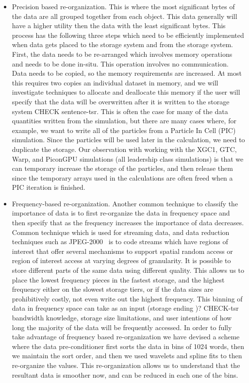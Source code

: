 \begin{itemize} 
	
\item Precision based re-organization. This is where the most significant bytes
	of the data are all grouped together from each object. This data
	generally will have a higher utility then the data with the least
	significant bytes.  This process has the following three steps which
	need to be efficiently implemented when data gets placed to the storage
	system and from the storage system.  First, the data needs to be
	re-arranged which involves memory operations and needs to be done
	in-situ. This operation involves no communication.  Data needs to be
	copied, so the memory requirements are increased. {\color{red}At most this requires
	two copies an individual dataset in memory, and we will investigate
	techniques to allocate and deallocate this memory if the user will
	specify that the data will be overwritten after it is written to the
	storage system CHECK sentence-tsr}. This is often the case for many of the data quantities
	written from the simulation, but there are many cases where, for
	example, we want to write all of the particles from a Particle In Cell
	(PIC) simulation.  Since the particles will be used later in the
	calculation, we need to duplicate the storage. Our observation with
	working with the XGC1, GTC, Warp, and PiconGPU simulations (all
	leadership class simulations) is that we can temporary increase the
	storage of the particles, and then release them since the temporary
	arrays used in the calculations are often freed when a PIC iteration is
	finished. 
%
\item Frequency-based re-organization.  Another common technique to classify
	the importance of data is to first re-organize the data in frequency
	space and then specify that as the frequency increases the importance
	of data decreases.   Common technique which is used for streaming data,
	and data reduction techniques such as JPEG-2000~\cite{jpeg2000} is to
	code streams which have regions of interest that offer several
	mechanisms to support spatial random access or region of interest
	access at varying degrees of granularity. It is possible to store
	different parts of the same data using different quality.  This allows
	us to place the lowest frequency pieces in the fastest storage, and the
	highest frequency either on the slowest storage tiers, or if the data
	sizes are prohibitively  costly, not even write out the highest
	frequency. This binning of data in frequency space can take as an input
	(storage  {\color{red}ending )? CHECK-tsr} bandwidth knowledge, storage size limitations, and user
	intentions of how long the majority of the data will be frequently
	accessed.  In order to fully take advantage of frequency based
	re-organization we have devised a scheme where the data pre-conditioner
	first sorts the data in bins of 1024 words, then we maintain the
	sort order, and then we used wavelets and spline fits to then
	re-organize the values.  This re-organization allows us to understand
	that the resultant data is smoother now, and can be reduced in each one
	of the bins.  \end{itemize}

